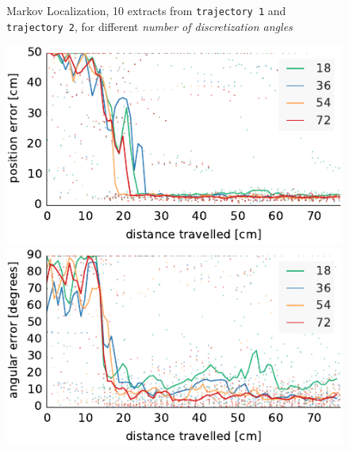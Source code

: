 \documentclass[letterpaper, 10pt, conference]{ieeeconf}
\begin{document}
\begin{figure}

\begin{center}
Markov Localization, 10 extracts from \texttt{trajectory~1} and \texttt{trajectory~2}, for different \emph{number of discretization angles}
\end{center}
\includegraphics{ml-small_runs_random_12-xy}\hfill
\includegraphics{ml-small_runs_random_12-theta}

\vspace{.5em}


\end{figure}
\end{document}
